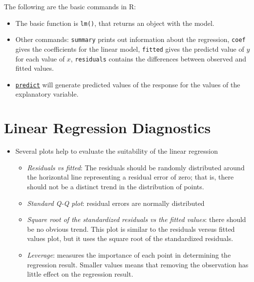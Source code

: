 \documentclass[]{book}
\providecommand{\tightlist}{%
  \setlength{\itemsep}{0pt}\setlength{\parskip}{0pt}}
\begin{document}
The following are the basic commands in R:

\begin{itemize}
\tightlist
\item
  The basic function is \texttt{lm()}, that returns an object with the
  model.
\item
  Other commands: \texttt{summary} prints out information about the
  regression, \texttt{coef} gives the coefficients for the linear model,
  \texttt{fitted} gives the predictd value of \(y\) for each value of
  \(x\), \texttt{residuals} contains the differences between observed
  and fitted values.
\item
  \href{https://stat.ethz.ch/R-manual/R-devel/library/stats/html/predict.lm.html}{\texttt{predict}}
  will generate predicted values of the response for the values of the
  explanatory variable.
\end{itemize}

\section{Linear Regression
Diagnostics}\label{linear-regression-diagnostics}

\begin{itemize}
\tightlist
\item
  Several plots help to evaluate the suitability of the linear
  regression

  \begin{itemize}
  \tightlist
  \item
    \emph{Residuals vs fitted}: The residuals should be randomly
    distributed around the horizontal line representing a residual error
    of zero; that is, there should not be a distinct trend in the
    distribution of points.
  \item
    \emph{Standard Q-Q plot}: residual errors are normally distributed
  \item
    \emph{Square root of the standardized residuals vs the fitted
    values}: there should be no obvious trend. This plot is similar to
    the residuals versus fitted values plot, but it uses the square root
    of the standardized residuals.
  \item
    \emph{Leverage}: measures the importance of each point in
    determining the regression result. Smaller values means that
    removing the observation has little effect on the regression result.
  \end{itemize}
\end{itemize}
\end{document}
